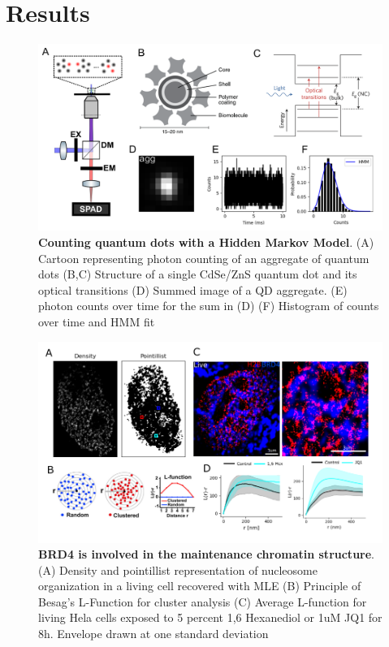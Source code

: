 \documentclass{ucetd}
\begin{document}
\section{Results}

\begin{figure}
\begin{center}
\includegraphics[width=14cm]{QD-Counting.png}
\end{center}
\caption{\textbf{Counting quantum dots with a Hidden Markov Model}. (A) Cartoon representing photon counting of an aggregate of quantum dots (B,C) Structure of a single CdSe/ZnS quantum dot and its optical transitions (D) Summed image of a QD aggregate. (E) photon counts over time for the sum in (D) (F) Histogram of counts over time and HMM fit}
\end{figure}

\begin{figure}
\begin{center}
\includegraphics[width=13cm]{BRD4-Results.png}
\end{center}
\caption{\textbf{BRD4 is involved in the maintenance chromatin structure}. (A) Density and pointillist representation of nucleosome organization in a living cell recovered with MLE (B) Principle of Besag's L-Function for cluster analysis (C) Average L-function for living Hela cells exposed to 5 percent 1,6 Hexanediol or 1uM JQ1 for 8h. Envelope drawn at one standard deviation}
\end{figure}
\end{document}
